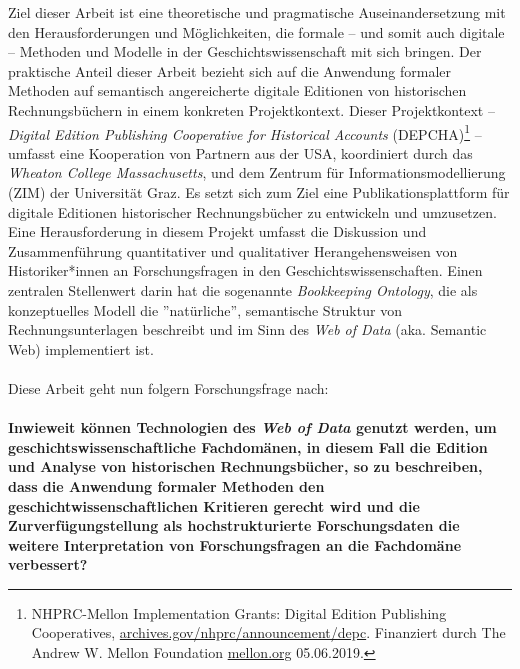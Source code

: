 \documentclass[12pt,a4paper]{article}
\begin{document}
Ziel dieser Arbeit ist eine theoretische und pragmatische Auseinandersetzung mit den Herausforderungen und Möglichkeiten, die formale -- und somit auch digitale -- Methoden und Modelle in der Geschichtswissenschaft mit sich bringen. Der praktische Anteil dieser Arbeit bezieht sich auf die Anwendung formaler Methoden auf semantisch angereicherte digitale Editionen von historischen Rechnungsbüchern in einem konkreten Projektkontext. Dieser Projektkontext -- \textit{Digital Edition Publishing Cooperative for Historical Accounts} (DEPCHA)\footnote{NHPRC-Mellon Implementation Grants: Digital Edition Publishing Cooperatives, \url{archives.gov/nhprc/announcement/depc}. Finanziert durch The Andrew W. Mellon Foundation \url{ mellon.org} 05.06.2019.} -- umfasst eine Kooperation von Partnern aus der USA, koordiniert durch das \textit{Wheaton College Massachusetts}, und dem Zentrum für Informationsmodellierung (ZIM) der Universität Graz. Es setzt sich zum Ziel eine Publikationsplattform für digitale Editionen historischer Rechnungsbücher zu entwickeln und umzusetzen. Eine Herausforderung in diesem Projekt umfasst die Diskussion und Zusammenführung quantitativer und qualitativer Herangehensweisen von Historiker*innen an Forschungsfragen in den Geschichtswissenschaften. Einen zentralen Stellenwert darin hat die sogenannte \textit{Bookkeeping Ontology}, die als konzeptuelles Modell die ''natürliche'', semantische Struktur von Rechnungsunterlagen beschreibt und im Sinn des \textit{Web of Data} (aka. Semantic Web) implementiert ist.
\\
\\
Diese Arbeit geht nun folgern Forschungsfrage nach:
\\
\\
\textbf{Inwieweit können Technologien des \textit{Web of Data} genutzt werden, um geschichtswissenschaftliche Fachdomänen, in diesem Fall die Edition und Analyse von historischen Rechnungsbücher, so zu beschreiben, dass die Anwendung formaler Methoden den geschichtwissenschaftlichen Kritieren gerecht wird und die Zurverfügungstellung als hochstrukturierte Forschungsdaten die weitere Interpretation von Forschungsfragen an die Fachdomäne verbessert?} 
\end{document}

